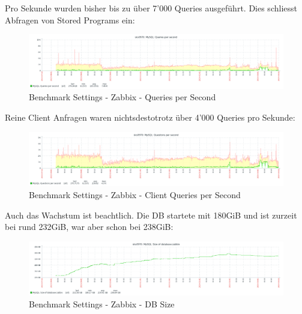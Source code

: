 \begin{flushleft}
    Pro Sekunde wurden bisher bis zu über 7'000 Queries ausgeführt.
    Dies schliesst Abfragen von Stored Programs ein:
    \begin{figure}[H]
        \centering
        \includegraphics[width=0.8\linewidth]{source/implementation/evaluation/benchmarking/sks0970_zabbix_mariadb_queries_per_second_graph}
        \caption{Benchmark Settings - Zabbix - Queries per Second}
        \label{fig:sks0970_zabbix_mariadb_queries_per_second_graph}
    \end{figure}
    Reine Client Anfragen waren nichtsdestotrotz über 4'000 Queries pro Sekunde:
    \begin{figure}[H]
        \centering
        \includegraphics[width=0.8\linewidth]{source/implementation/evaluation/benchmarking/sks0970_zabbix_mariadb_questions_per_second_graph}
        \caption{Benchmark Settings - Zabbix - Client Queries per Second}
        \label{fig:sks0970_zabbix_mariadb_questions_per_second_graph}
    \end{figure}
\end{flushleft}
\begin{flushleft}
    Auch das Wachstum ist beachtlich.
    Die DB startete mit 180GiB und ist zurzeit bei rund 232GiB, war aber schon bei 238GiB:
    \begin{figure}[H]
        \centering
        \includegraphics[width=0.8\linewidth]{source/implementation/evaluation/benchmarking/sks0970_zabbix_mariadb_size_graph}
        \caption{Benchmark Settings - Zabbix - DB Size}
        \label{fig:sks0970_zabbix_mariadb_size_graph}
    \end{figure}
\end{flushleft}
\clearpage
